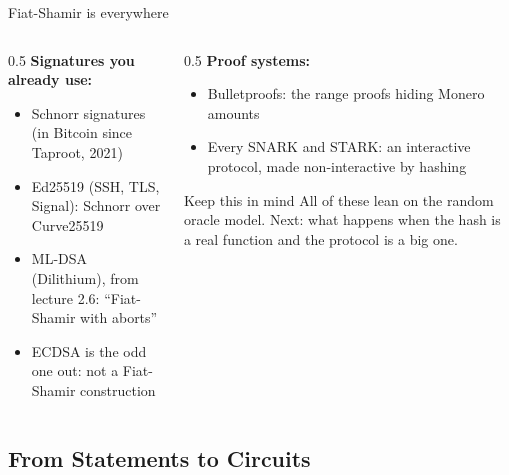 \ifdefined\PRESENTATION\else\PassOptionsToClass{handout}{beamer}\fi\documentclass[aspectratio=169, lualatex]{beamer}
\begin{document}
\begin{frame}{Fiat-Shamir is everywhere}
	\begin{columns}[c]
		\begin{column}{0.5\textwidth}
			\textbf{Signatures you already use:}
			\begin{itemize}
				\item Schnorr signatures (in Bitcoin since Taproot, 2021)
				\item Ed25519 (SSH, TLS, Signal): Schnorr over Curve25519
				\item ML-DSA (Dilithium), from lecture 2.6: ``Fiat-Shamir with aborts''
				\item ECDSA is the odd one out: not a Fiat-Shamir construction
			\end{itemize}
		\end{column}
		\begin{column}{0.5\textwidth}
			\textbf{Proof systems:}
			\begin{itemize}
				\item Bulletproofs: the range proofs hiding Monero amounts
				\item Every SNARK and STARK: an interactive protocol, made non-interactive by hashing
			\end{itemize}
			\begin{alertblock}{Keep this in mind}
				All of these lean on the random oracle model. Next: what happens when the hash is a real function and the protocol is a big one.
			\end{alertblock}
		\end{column}
	\end{columns}
\end{frame}

\subsection{From Statements to Circuits}
\end{document}
